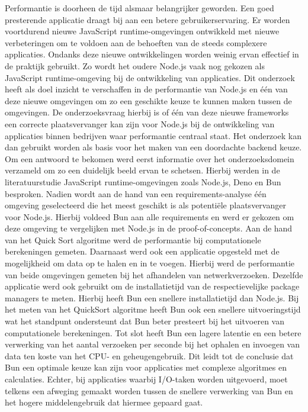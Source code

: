 Performantie is doorheen de tijd alsmaar belangrijker geworden. 
Een goed presterende applicatie draagt bij aan een betere gebruikerservaring.
Er worden voortdurend nieuwe JavaScript runtime-omgevingen ontwikkeld met nieuwe verbeteringen om
te voldoen aan de behoeften van de steeds complexere applicaties.
Ondanks deze nieuwe ontwikkelingen worden weinig ervan effectief in de praktijk gebruikt.
Zo wordt het oudere Node.js vaak nog gekozen als JavaScript runtime-omgeving bij de ontwikkeling van applicaties.
Dit onderzoek heeft als doel inzicht te verschaffen in de performantie van Node.js en één van deze nieuwe omgevingen
om zo een geschikte keuze te kunnen maken tussen de omgevingen.
De onderzoeksvraag hierbij is of één van deze nieuwe frameworks  
een correcte plaatsvervanger kan zijn voor Node.js bij de ontwikkeling van applicaties binnen bedrijven 
waar performantie centraal staat. Het onderzoek kan dan gebruikt worden als basis 
voor het maken van een doordachte backend keuze.
Om een antwoord te bekomen werd eerst informatie over het onderzoeksdomein verzameld om zo een duidelijk beeld ervan te schetsen.
Hierbij werden in de literatuurstudie JavaScript runtime-omgevingen zoals Node.js, Deno en Bun besproken.
Nadien wordt aan de hand van een requirements-analyse één omgeving geselecteerd die het meest geschikt is als potentiële plaatsvervanger voor Node.js.
Hierbij voldeed Bun aan alle requirements en werd er gekozen om deze omgeving te vergelijken met Node.js in de proof-of-concepts.
Aan de hand van het Quick Sort algoritme werd de performantie bij computationele berekeningen gemeten.
Daarnaast werd ook een applicatie opgesteld met de mogelijkheid om data op te halen en in te voegen. 
Hierbij werd de performantie van beide omgevingen gemeten bij het afhandelen van netwerkverzoeken.
Dezelfde applicatie werd ook gebruikt om de installatietijd van de respectievelijke package managers te meten.
Hierbij heeft Bun een snellere installatietijd dan Node.js.
Bij het meten van het QuickSort algoritme heeft Bun ook een snellere uitvoeringstijd wat het standpunt 
ondersteunt dat Bun beter presteert bij het uitvoeren van computationele berekeningen.
Tot slot heeft Bun een lagere latentie en een betere verwerking van het aantal verzoeken per seconde bij het ophalen en
invoegen van data ten koste van het CPU- en geheugengebruik.
Dit leidt tot de conclusie dat Bun een optimale keuze kan zijn voor applicaties met complexe algoritmes en calculaties. Echter, 
bij applicaties waarbij I/O-taken worden uitgevoerd, moet telkens een afweging gemaakt worden tussen de snellere verwerking van Bun
en het hogere middelengebruik dat hiermee gepaard gaat.


